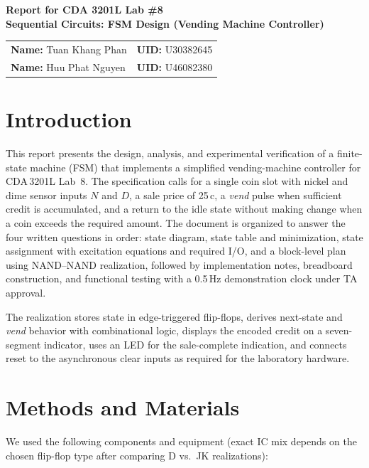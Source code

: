 \documentclass[12pt, letterpaper]{article}
\begin{document}
\begin{center}
  {\Large \textbf{Report for CDA 3201L Lab \#8}}\\[10pt]
  {\large \textbf{Sequential Circuits: FSM Design (Vending Machine Controller)}}\\[20pt]
  \begin{tabular}{ll}
    \textbf{Name:} Tuan Khang Phan & \textbf{UID:} U30382645 \\[4pt]
    \textbf{Name:} Huu Phat Nguyen & \textbf{UID:} U46082380 \\
  \end{tabular}
\end{center}

\section{Introduction}

This report presents the design, analysis, and experimental verification of a finite-state
machine (FSM) that implements a simplified vending-machine controller for CDA\,3201L Lab~8.
The specification calls for a single coin slot with nickel and dime sensor inputs $N$ and
$D$, a sale price of 25\,c, a \textit{vend} pulse when sufficient credit is accumulated, and a
return to the idle state without making change when a coin exceeds the required amount.  The
document is organized to answer the four written questions in order: state diagram, state
table and minimization, state assignment with excitation equations and required I/O, and a
block-level plan using NAND--NAND realization, followed by implementation notes, breadboard
construction, and functional testing with a 0.5\,Hz demonstration clock under TA approval.

The realization stores state in edge-triggered flip-flops, derives next-state and
\textit{vend} behavior with combinational logic, displays the encoded credit on a seven-segment
indicator, uses an LED for the sale-complete indication, and connects reset to the asynchronous
clear inputs as required for the laboratory hardware.

\section{Methods and Materials}

We used the following components and equipment (exact IC mix depends on the chosen flip-flop
type after comparing D vs.\ JK realizations):
\end{document}
